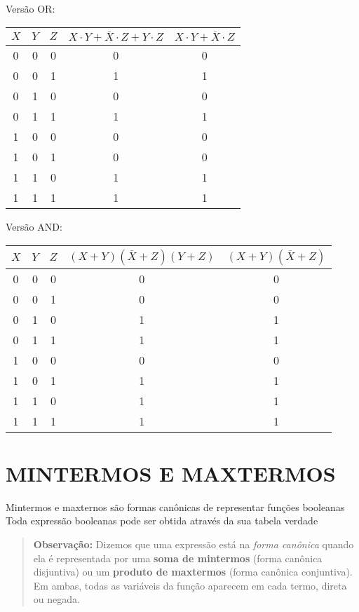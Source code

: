 \documentclass[12pt]{article}
\begin{document}
Versão OR:
\begin{center}
\begin{tabular}{|c|c|c|c|c|}
\hline
$X$  & $Y$ & $Z$ & $X \cdot Y + \overline{X} \cdot Z + Y \cdot Z$ & $X \cdot Y + \overline{X} \cdot Z$ \\
\hline
0 & 0 & 0 & 0 & 0 \\
0 & 0 & 1 & 1 & 1 \\
0 & 1 & 0 & 0 & 0 \\
0 & 1 & 1 & 1 & 1 \\
1 & 0 & 0 & 0 & 0 \\
1 & 0 & 1 & 0 & 0 \\
1 & 1 & 0 & 1 & 1 \\
1 & 1 & 1 & 1 & 1 \\
\hline
\end{tabular}
\end{center}

Versão AND:
\begin{center}
\begin{tabular}{|c|c|c|c|c|}
\hline
$X$  & $Y$ & $Z$ &  $(X + Y)(\overline{X} + Z)(Y + Z)$ & $(X + Y)(\overline{X} + Z)$ \\
\hline
0 & 0 & 0 & 0 & 0 \\
0 & 0 & 1 & 0 & 0 \\
0 & 1 & 0 & 1 & 1 \\
0 & 1 & 1 & 1 & 1 \\
1 & 0 & 0 & 0 & 0 \\
1 & 0 & 1 & 1 & 1 \\
1 & 1 & 0 & 1 & 1 \\
1 & 1 & 1 & 1 & 1 \\
\hline
\end{tabular}
\end{center}

\section{MINTERMOS E MAXTERMOS}
Mintermos e maxternos são formas canônicas de representar funções booleanas
Toda expressão booleanas pode ser obtida através da sua tabela verdade
\begin{quote}
\textbf{Observação:} Dizemos que uma expressão está na \textit{forma canônica} quando ela é representada por uma \textbf{soma de mintermos} (forma canônica disjuntiva) ou um \textbf{produto de maxtermos} (forma canônica conjuntiva). Em ambas, todas as variáveis da função aparecem em cada termo, direta ou negada.
\end{quote}
\end{document}
